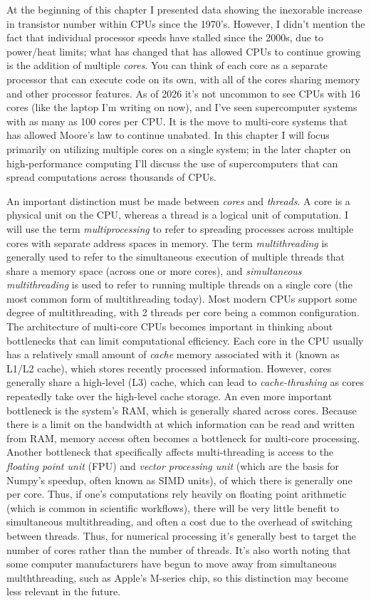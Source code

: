 At the beginning of this chapter I presented data showing the inexorable increase in transistor number within CPUs since the 1970's.  However, I didn't mention the fact that individual processor speeds have stalled since the 2000s, due to power/heat limits; what has changed that has allowed CPUs to continue growing is the addition of multiple \textit{cores}.  You can think of each core as a separate processor that can execute code on its own, with all of the cores sharing memory and other processor features.  As of 2026 it's not uncommon to see CPUs with 16 cores (like the laptop I'm writing on now), and I've seen supercomputer systems with as many as 100 cores per CPU.  It is the move to multi-core systems that has allowed Moore's law to continue unabated. In this chapter I will focus primarily on utilizing multiple cores on a single system; in the later chapter on high-performance computing I'll discuss the use of supercomputers that can spread computations across thousands of CPUs.

An important distinction must be made between \textit{cores} and \textit{threads}.  A core is a physical unit on the CPU, whereas a thread is a logical unit of computation.  I will use the term \textit{multiprocessing} to refer to spreading processes across multiple cores with separate address spaces in memory.  The term \textit{multithreading} is generally used to refer to the simultaneous execution of multiple threads that share a memory space (across one or more cores), and \textit{simultaneous multithreading} is used to refer to running multiple threads on a single core (the most common form of multithreading today).  Most modern CPUs support some degree of multithreading, with 2 threads per core being a common configuration.  The architecture of multi-core CPUs becomes important in thinking about bottlenecks that can limit computational efficiency.  Each core in the CPU usually has a relatively small amount of \textit{cache} memory associated with it (known as L1/L2 cache), which stores recently processed information.  However, cores generally share a high-level (L3) cache, which can lead to \textit{cache-thrashing} as cores repeatedly take over the high-level cache storage. An even more important bottleneck is the system's RAM, which is generally shared across cores.  Because there is a limit on the bandwidth at which information can be read and written from RAM, memory access often becomes a bottleneck for multi-core processing. Another bottleneck that specifically affects multi-threading is access to the \textit{floating point unit} (FPU) and \textit{vector processing unit} (which are the basis for Numpy's speedup, often known as SIMD units), of which there is generally one per core.  Thus, if one's computations rely heavily on floating point arithmetic (which is common in scientific workflows), there will be very little benefit to simultaneous multithreading, and often a cost due to the overhead of switching between threads.  Thus, for numerical processing it's generally best to target the number of cores rather than the number of threads. It's also worth noting that some computer manufacturers have begun to move away from simultaneous mulththreading, such as Apple's M-series chip, so this distinction may become less relevant in the future.

